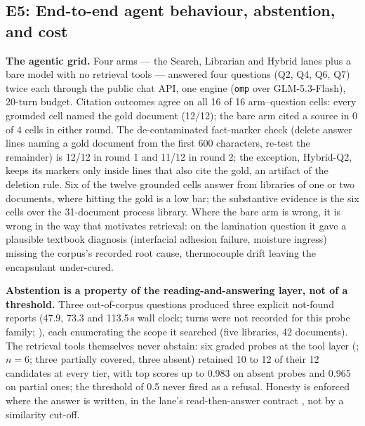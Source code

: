 
\subsection{E5: End-to-end agent behaviour, abstention, and cost}
\label{sec:e5}
\label{sec:agentic}\label{sec:abstention}\label{sec:composition}\label{sec:eval-agent}

\textbf{The agentic grid.}
Four arms --- the Search, Librarian and Hybrid lanes plus a bare model with
no retrieval tools --- answered four questions (Q2, Q4, Q6, Q7) twice each
through the public chat API, one engine (\texttt{omp} over GLM-5.3-Flash),
20-turn budget. Citation outcomes agree on all 16 of 16 arm--question cells:
every grounded cell named the gold document (12/12); the bare arm cited a
source in 0 of 4 cells in either round. The de-contaminated fact-marker
check (delete answer lines naming a gold document from the first 600
characters, re-test the remainder) is 12/12 in round 1 and 11/12 in round 2;
the exception, Hybrid-Q2, keeps its markers only inside lines that also cite
the gold, an artifact of the deletion rule. Six of the twelve grounded cells
answer from libraries of one or two documents, where hitting the gold is a
low bar; the substantive evidence is the six cells over the 31-document
process library. Where the bare arm is wrong, it is
wrong in the way that motivates retrieval: on the lamination question it
gave a plausible textbook diagnosis (interfacial adhesion failure, moisture
ingress) missing the corpus's recorded root cause, thermocouple drift
leaving the encapsulant under-cured.

\textbf{Abstention is a property of the reading-and-answering layer, not of
a threshold.}
Three out-of-corpus questions produced three explicit not-found reports
(47.9, 73.3 and 113.5\,s wall clock; turns were not recorded for this probe
family; ), each
enumerating the scope it searched (five libraries, 42
documents). The retrieval tools themselves never abstain: six graded probes
at the tool layer
(;
$n = 6$; three partially covered, three absent) retained 10
to 12 of their 12 candidates at every tier, with top scores up to 0.983 on
absent probes and 0.965 on partial ones; the threshold of 0.5 never fired as
a refusal. Honesty is enforced where the answer is written, in the lane's
read-then-answer contract \cite{selfrag,feng-abstain,yin-knowwhat}, not by a
similarity cut-off.

